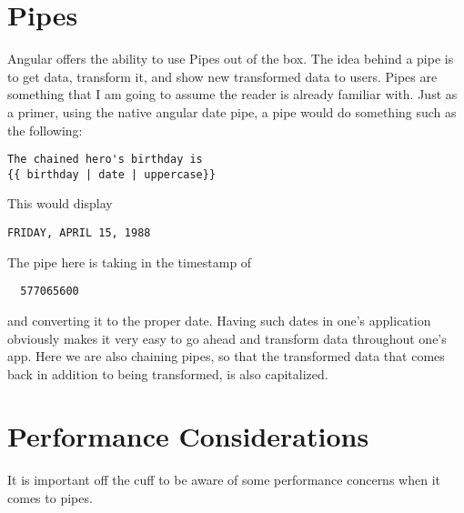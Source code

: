 \section{ Pipes }
\maketitle{}

Angular offers the ability to use Pipes out of the box. The idea behind a pipe
is to get data, transform it, and show new transformed data to users. Pipes are
something that I am going to assume the reader is already familiar with. Just as
a primer, using the native angular date pipe, a pipe would do something such
as the following:
\begin{lstlisting}
The chained hero's birthday is
{{ birthday | date | uppercase}}
\end{lstlisting}

This would display
\begin{verbatim}
FRIDAY, APRIL 15, 1988
\end{verbatim}

The pipe here is taking in the timestamp of
\begin{verbatim}
  577065600
\end{verbatim}
and converting it to the proper date. Having such dates in one's application
obviously makes it very easy to go ahead and transform data throughout one's
app. Here we are also chaining pipes, so that the transformed data that comes
back in addition to being transformed, is also capitalized.

\section{ Performance Considerations }
It is important off the cuff to be aware of some performance concerns when it
comes to pipes.
